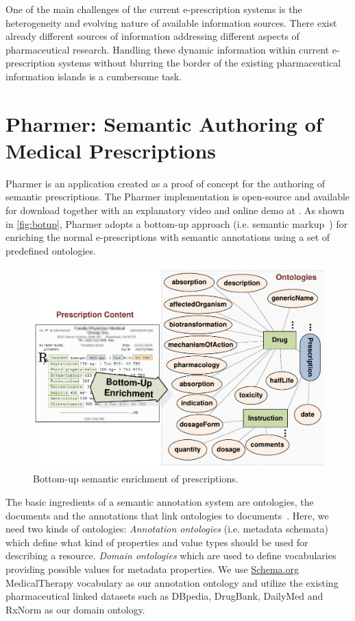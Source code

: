 \documentclass[10pt, conference, compsocconf]{IEEEtran}
\begin{document}
One of the main challenges of the current e-prescription systems is the heterogeneity and evolving nature of available information sources.
There exist already different sources of information addressing different aspects of pharmaceutical research.
Handling these dynamic information within current e-prescription systems without blurring the border of the existing pharmaceutical information islands is a cumbersome task.

\section{Pharmer: Semantic Authoring of Medical Prescriptions}
\label{sec:pharmer}
Pharmer is an application created as a proof of concept for the authoring of semantic prescriptions.
The Pharmer implementation is open-source and available for download together with an explanatory video and online demo at \cite{pharmerproject}.
As shown in \autoref{fig:botup}, Pharmer adopts a bottom-up approach (i.e. semantic markup~\cite{araujo2010}) for enriching the normal e-prescriptions with semantic annotations using a set of predefined ontologies.

\begin{figure}[tb]
	\centering
		\includegraphics[width=1.0\columnwidth]{images/approaches.pdf}
	\caption{Bottom-up semantic enrichment of prescriptions.}
	\label{fig:botup}
\end{figure}

The basic ingredients of a semantic annotation system are ontologies, the documents and the annotations that link ontologies to documents~\cite{khalili2012}.
Here, we need two kinds of ontologies:
\emph{Annotation ontologies} (i.e. metadata schemata) which define what kind of properties and value types should be used for describing a resource.
\emph{Domain ontologies} which are used to define vocabularies providing possible values for metadata properties.
We use \url{Schema.org} MedicalTherapy vocabulary as our annotation ontology and utilize the existing pharmaceutical linked datasets such as DBpedia, DrugBank, DailyMed and RxNorm as our domain ontology.
\end{document}
